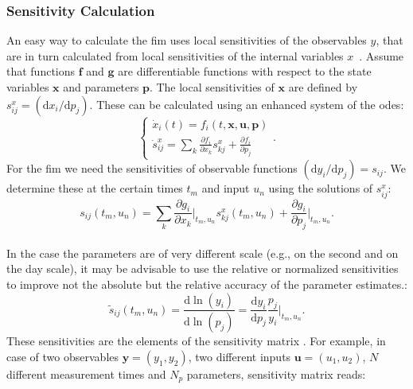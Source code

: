 \documentclass[graybox]{svmult}
\newcommand{\mbx}{\mathbf{x}}
\newcommand{\mbu}{\mathbf{u}}
\newcommand{\mbp}{\mathbf{p}}
\newcommand{\mby}{\mathbf{y}}
\newcommand{\mbg}{\mathbf{g}}
\newcommand{\mbf}{\mathbf{f}}
\begin{document}
\subsubsection*{Sensitivity Calculation}
An easy way to calculate the \ac{fim} uses local sensitivities of the observables $y$, that are in turn calculated from local sensitivities of the internal variables $x$~\cite{versyckIntroducingOptimal1999, banks_generalized_2010}.
Assume that functions $\mbf$ and $\mbg$ are differentiable functions with respect to the state variables $\mbx$ and parameters $\mbp$.
The local sensitivities of $\mbx$ are defined by $s^x_{ij} = (\mathrm{d} x_i / \mathrm{d} p_j )$.
These can be calculated using an enhanced system of the \acp{ode}:
\begin{equation}
    \begin{cases}
    \dot x_i (t) = f_i(t, \mbx, \mbu, \mbp)\\
    \dot s^x_{ij} = \sum_k \frac{\partial f_i}{\partial x_k} s^x_{kj} + \frac{\partial f_i}{\partial p_j}
    \end{cases}.
\label{eq:ode_and_sensitiv}
\end{equation}
For the \ac{fim} we need the sensitivities of observable functions $(\mathrm{d} y_i / \mathrm{d} p_j) = s_{ij}$.
We determine these at the certain times $t_m$ and input $u_n$ using the solutions of $s^x_{ij}$:
\begin{equation}
    s_{ij} (t_m, u_n) = \sum_k \frac{\partial g_i}{\partial x_k}\bigg|_{t_m, u_n} s_{kj}^x (t_m, u_n) + \frac{\partial g_i}{\partial p_j}\bigg|_{t_m, u_n}.
\label{eq:observ_sensitivities}
\end{equation}
\\
In the case the parameters are of very different scale (e.g., on the second and on the day scale), it may be advisable to use the relative or normalized sensitivities to improve not the absolute but the relative accuracy of the parameter estimates.:
\begin{equation}
    \tilde{s}_{ij} (t_m, u_n) =\frac{\mathrm{d}\ln(y_i)}{\mathrm{d}\ln(p_j)} = \frac{\mathrm{d} y_i}{\mathrm{d} p_j} \frac{p_j}{y_i}\bigg|_{t_m, u_n}.
\label{eq:relat_sensitivities}
\end{equation}
These sensitivities are the elements of the sensitivity matrix \cite{stigterObservabilityComplex2017}.
For example, in case of two observables $\mby = (y_1, y_2)$, two different inputs $\mbu = (u_1, u_2)$, $N$ different measurement times and $N_p$ parameters, sensitivity matrix reads:
\end{document}
